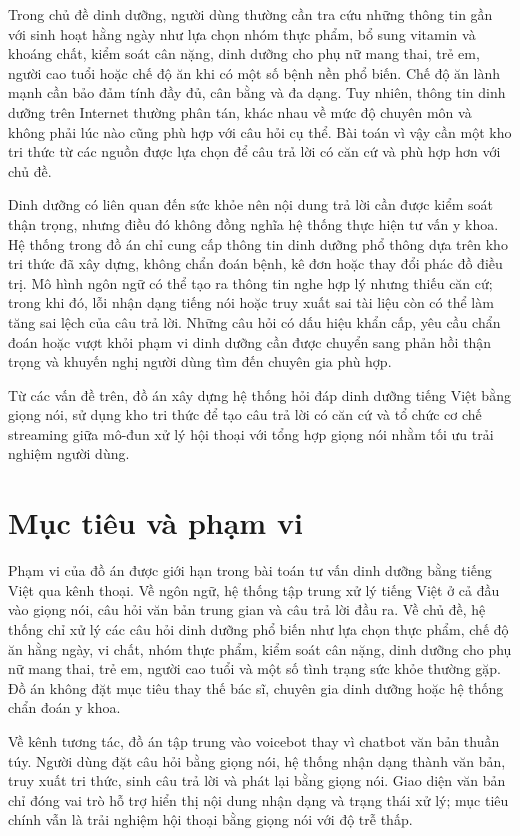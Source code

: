 \documentclass[a4paper,13pt,oneside]{report}
\begin{document}
Trong chủ đề dinh dưỡng, người dùng thường cần tra cứu những thông tin gần với sinh hoạt hằng ngày như lựa chọn nhóm thực phẩm, bổ sung vitamin và khoáng chất, kiểm soát cân nặng, dinh dưỡng cho phụ nữ mang thai, trẻ em, người cao tuổi hoặc chế độ ăn khi có một số bệnh nền phổ biến. Chế độ ăn lành mạnh cần bảo đảm tính đầy đủ, cân bằng và đa dạng. Tuy nhiên, thông tin dinh dưỡng trên Internet thường phân tán, khác nhau về mức độ chuyên môn và không phải lúc nào cũng phù hợp với câu hỏi cụ thể. Bài toán vì vậy cần một kho tri thức từ các nguồn được lựa chọn để câu trả lời có căn cứ và phù hợp hơn với chủ đề.

Dinh dưỡng có liên quan đến sức khỏe nên nội dung trả lời cần được kiểm soát thận trọng, nhưng điều đó không đồng nghĩa hệ thống thực hiện tư vấn y khoa. Hệ thống trong đồ án chỉ cung cấp thông tin dinh dưỡng phổ thông dựa trên kho tri thức đã xây dựng, không chẩn đoán bệnh, kê đơn hoặc thay đổi phác đồ điều trị. Mô hình ngôn ngữ có thể tạo ra thông tin nghe hợp lý nhưng thiếu căn cứ; trong khi đó, lỗi nhận dạng tiếng nói hoặc truy xuất sai tài liệu còn có thể làm tăng sai lệch của câu trả lời. Những câu hỏi có dấu hiệu khẩn cấp, yêu cầu chẩn đoán hoặc vượt khỏi phạm vi dinh dưỡng cần được chuyển sang phản hồi thận trọng và khuyến nghị người dùng tìm đến chuyên gia phù hợp.

Từ các vấn đề trên, đồ án xây dựng hệ thống hỏi đáp dinh dưỡng tiếng Việt bằng giọng nói, sử dụng kho tri thức để tạo câu trả lời có căn cứ và tổ chức cơ chế streaming giữa mô-đun xử lý hội thoại với tổng hợp giọng nói nhằm tối ưu trải nghiệm người dùng.

\section{Mục tiêu và phạm vi}

Phạm vi của đồ án được giới hạn trong bài toán tư vấn dinh dưỡng bằng tiếng Việt qua kênh thoại. Về ngôn ngữ, hệ thống tập trung xử lý tiếng Việt ở cả đầu vào giọng nói, câu hỏi văn bản trung gian và câu trả lời đầu ra. Về chủ đề, hệ thống chỉ xử lý các câu hỏi dinh dưỡng phổ biến như lựa chọn thực phẩm, chế độ ăn hằng ngày, vi chất, nhóm thực phẩm, kiểm soát cân nặng, dinh dưỡng cho phụ nữ mang thai, trẻ em, người cao tuổi và một số tình trạng sức khỏe thường gặp. Đồ án không đặt mục tiêu thay thế bác sĩ, chuyên gia dinh dưỡng hoặc hệ thống chẩn đoán y khoa.

Về kênh tương tác, đồ án tập trung vào voicebot thay vì chatbot văn bản thuần túy. Người dùng đặt câu hỏi bằng giọng nói, hệ thống nhận dạng thành văn bản, truy xuất tri thức, sinh câu trả lời và phát lại bằng giọng nói. Giao diện văn bản chỉ đóng vai trò hỗ trợ hiển thị nội dung nhận dạng và trạng thái xử lý; mục tiêu chính vẫn là trải nghiệm hội thoại bằng giọng nói với độ trễ thấp.
\end{document}
